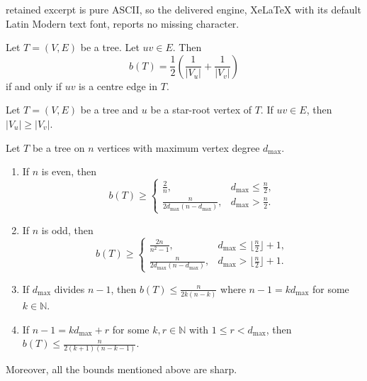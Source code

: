 \documentclass[10pt,a4paper]{amsart}
\begin{document}
retained excerpt is pure ASCII, so the delivered engine, XeLaTeX with its default Latin Modern text font, reports no missing character.
\begin{theorem}\label{extended centre edge result}
    Let $T=(V, E)$ be a tree. Let $uv \in E$. Then 
    $$
b(T)=\frac{1}{2}\left(\frac{1}{\vert V_u \vert} +\frac{1}{\vert V_v\vert} \right)
    $$
    if and only if $uv$ is a centre edge in $T$.
\end{theorem}

\begin{lemma}\label{centre vertex domination}
    Let $T=(V,E)$ be a tree and $u$ be a star-root vertex of  $T$. If $uv \in E$, then $\vert V_u \vert \geq \vert V_v\vert.$
\end{lemma}

\begin{theorem}\label{extremal-graph-max-vertex-degree}
    Let $T$ be a tree on $n$ vertices with maximum vertex degree $d_{\max}.$       
\begin{enumerate}
    \item If $n$ is even, then
    \[
        b(T) \geq 
        \begin{cases} 
            \frac{2}{n}, & d_{\max} \leq \frac{n}{2}, \\
            \frac{n}{2d_{\max}(n-d_{\max})}, & d_{\max} > \frac{n}{2}.
        \end{cases}
    \]
    \item If $n$ is odd, then
    \[
        b(T) \geq 
        \begin{cases} 
            \frac{2n}{n^2 - 1}, & d_{\max} \leq \lfloor \frac{n}{2} \rfloor + 1, \\
            \frac{n}{2d_{\max}(n-d_{\max})}, & d_{\max} > \lfloor \frac{n}{2} \rfloor + 1.
        \end{cases}
     \]
     \item If $d_{\max}$ divides $n-1$, then $b(T) \leq \frac{n}{2k(n-k)}$ where $n-1=kd_{\max}$ for some $k \in \mathbb{N}$.
     \item If $n-1=k d_{\max}+r$ for some $k,r \in \mathbb{N}$ with $1 \leq r <d_{\max}$, then $b(T) \leq \frac{n}{2(k+1)(n-k-1)}.$
\end{enumerate}
Moreover, all the bounds mentioned above are sharp.
 \end{theorem}
\end{document}
